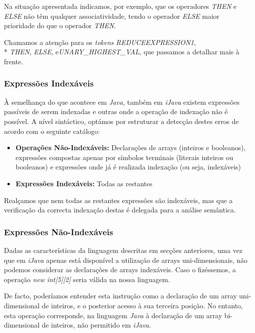 \documentclass[11pt,a4paper]{article}
\begin{document}
Na situação apresentada indicamos, por exemplo, que os operadores \emph{THEN} e \emph{ELSE} não têm qualquer associatividade, tendo o operador \emph{ELSE} maior prioridade do que o operador \emph{THEN}.

Chamamos a atenção para os \emph{tokens} \emph{REDUCEEXPRESSION1}, \\* \emph{THEN}, \emph{ELSE}, e\emph{UNARY\_HIGHEST\_VAL}, que passamos a detalhar mais à frente.

\subsubsection{Expressões Indexáveis}

À semelhança do que acontece em \emph{Java}, também em \emph{iJava} existem expressões passíveis de serem indexadas e outras onde a operação de indexação não é possível. A nível sintáctico, optámos por estruturar a detecção destes erros de acordo com o seguinte catálogo:

\begin{itemize}
\item \textbf{Operações Não-Indexáveis:} Declarações de arrays (inteiros e booleanos), expressões compostas apenas por símbolos terminais (literais inteiros ou booleanos) e expressões onde já é realizada indexação (ou seja, indexáveis)

\item \textbf{Expressões Indexáveis:} Todas as restantes
\end{itemize}

Realçamos que nem todas as restantes expressões são indexáveis, mas que a verificação da correcta indexação destas é delegada para a análise semântica.

\subsubsection{Expressões Não-Indexáveis}

Dadas as características da linguagem descritas em secções anteriores, uma vez que em \emph{iJava} apenas está disponível a utilização de arrays uni-dimensionais, não podemos considerar as declarações de arrays indexáveis. Caso o fizéssemos, a operação \emph{new int[5][2]} seria válida na nossa linguagem.

De facto, poderíamos entender esta instrução como a declaração de um array uni-dimensional de inteiros, e o posterior acesso à sua terceira posição. No entanto, esta operação corresponde, na linguagem \emph{Java} à declaração de um array bi-dimensional de inteiros, não permitido em \emph{iJava}.
\end{document}
